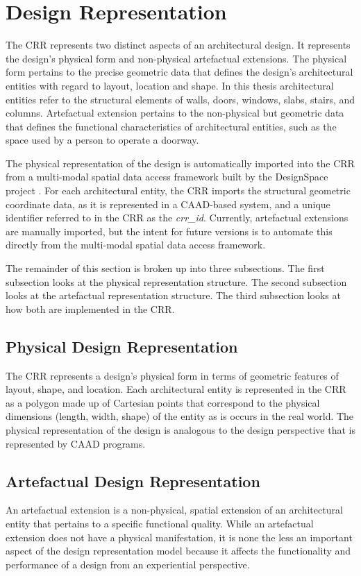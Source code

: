 \documentclass[12pt]{ucthesis}
\begin{document}
\section{Design Representation}
The CRR represents two distinct aspects of an architectural design. It represents the design's physical form and non-physical artefactual extensions. The physical form pertains to the precise geometric data that defines the design's architectural entities with regard to layout, location and shape. In this thesis architectural entities refer to the structural elements of walls, doors, windows, slabs, stairs, and columns. Artefactual extension pertains to the non-physical but geometric data that defines the functional characteristics of architectural entities, such as the space used by a person to operate a doorway.

The physical representation of the design is automatically imported into the CRR from a multi-modal spatial data access framework \cite{MultiModal} built by the DesignSpace project \cite{DesignSpace}. For each architectural entity, the CRR imports the structural geometric coordinate data, as it is represented in a CAAD-based system, and a unique identifier referred to in the CRR as the \emph{crr\_id}. Currently, artefactual extensions are manually imported, but the intent for future versions is to automate this directly from the multi-modal spatial data access framework.  

The remainder of this section is broken up into three subsections. The first subsection looks at the physical representation structure. The second subsection looks at the artefactual representation structure. The third subsection looks at how both are implemented in the CRR.

\subsection{Physical Design Representation}
The CRR represents a design's physical form in terms of geometric features of layout, shape, and location. Each architectural entity is represented in the CRR as a polygon made up of Cartesian points that correspond to the physical dimensions (length, width, shape) of the entity as is occurs in the real world. The physical representation of the design is analogous to the design perspective that is represented by CAAD programs. 


\subsection{Artefactual Design Representation}
An artefactual extension is a non-physical, spatial extension of an architectural entity that pertains to a specific functional quality. While an artefactual extension does not have a physical manifestation, it is none the less an important aspect of the design representation model because it affects the functionality and performance of a design from an experiential perspective. 
\end{document}
